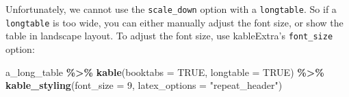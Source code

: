 \documentclass[a4paper, twoside]{templates/ociamthesis}
\newenvironment{Shaded}{\begin{snugshade}}{\end{snugshade}}
\newcommand{\DataTypeTok}[1]{\textcolor[rgb]{0.13,0.29,0.53}{#1}}
\newcommand{\DecValTok}[1]{\textcolor[rgb]{0.00,0.00,0.81}{#1}}
\newcommand{\KeywordTok}[1]{\textcolor[rgb]{0.13,0.29,0.53}{\textbf{#1}}}
\newcommand{\NormalTok}[1]{#1}
\newcommand{\OperatorTok}[1]{\textcolor[rgb]{0.81,0.36,0.00}{\textbf{#1}}}
\newcommand{\OtherTok}[1]{\textcolor[rgb]{0.56,0.35,0.01}{#1}}
\newcommand{\StringTok}[1]{\textcolor[rgb]{0.31,0.60,0.02}{#1}}
\renewenvironment{Shaded}
{
  \vspace{10pt}%
  \begin{snugshade}%
}{%
  \end{snugshade}%
  \vspace{8pt}%
}
\theoremstyle{definition}
\theoremstyle{definition}
\theoremstyle{definition}
\theoremstyle{definition}
\theoremstyle{remark}
\begin{document}
Unfortunately, we cannot use the \texttt{scale\_down} option with a \texttt{longtable}.
So if a \texttt{longtable} is too wide, you can either manually adjust the font size, or show the table in landscape layout.
To adjust the font size, use kableExtra's \texttt{font\_size} option:

\begin{Shaded}
\begin{Highlighting}[]
\NormalTok{a\_long\_table }\OperatorTok{\%\textgreater{}\%}\StringTok{ }
\StringTok{  }\KeywordTok{kable}\NormalTok{(}\DataTypeTok{booktabs =} \OtherTok{TRUE}\NormalTok{, }\DataTypeTok{longtable =} \OtherTok{TRUE}\NormalTok{) }\OperatorTok{\%\textgreater{}\%}\StringTok{ }
\StringTok{  }\KeywordTok{kable\_styling}\NormalTok{(}\DataTypeTok{font\_size =} \DecValTok{9}\NormalTok{, }\DataTypeTok{latex\_options =} \StringTok{"repeat\_header"}\NormalTok{)}
\end{Highlighting}
\end{Shaded}

\begingroup\fontsize{9}{11}\selectfont
\end{document}

